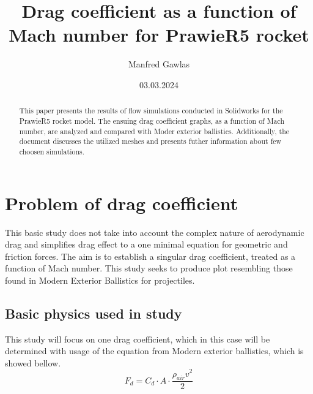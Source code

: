 \documentclass{article}
\title{Drag coefficient as a function of Mach number for PrawieR5 rocket}
\author{Manfred Gawlas}
\date{03.03.2024}
\begin{document}
\maketitle

\begin{abstract}
	This paper presents the results of flow simulations conducted in Solidworks for the PrawieR5 rocket model. The ensuing drag coefficient graphs, as a 			function of Mach number, are analyzed and compared with Moder exterior ballistics. Additionally, the document discusses the utilized meshes and 				presents futher information about few choosen simulations.
\end{abstract}

\printnomenclature

\section{Problem of drag coefficient}

This basic study does not take into account the complex nature of aerodynamic drag and simplifies drag effect to a one minimal equation for geometric 			and friction forces. The aim is to establish a singular drag coefficient, treated as a function of Mach number. This study seeks to produce plot resembling 			those found in Modern Exterior Ballistics for projectiles.

\subsection{Basic physics used in study}
This study will focus on one drag coefficient, which in this case will be determined with usage of the equation from Modern exterior ballistics\cite{MEB}, which is showed bellow.
\begin{equation}
F_d = C_d \cdot A \cdot \frac{\rho_{air}v^2}{2}
\end{equation}
\end{document}
